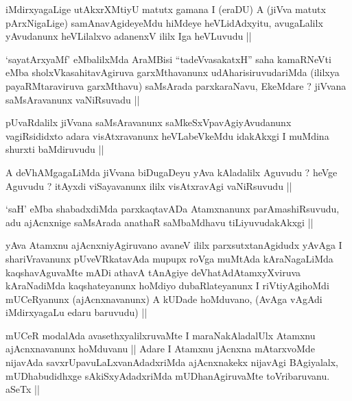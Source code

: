 \begin{artha}
iMdirxyagaLige utAkxrXMtiyU matutx gamana I (eraDU) A (jiVva matutx
pArxNigaLige) samAnavAgideyeMdu hiMdeye heVLidAdxyitu, avugaLalilx
yAvudanunx heVLilalxvo adanenxV ililx Iga heVLuvudu ||
\end{artha}


\begin{artha}
`sayatArxyaMf' eMbalilxMda AraMBisi ``tadeVvasakatxH'' saha kamaRNeVti
  eMba sholxVkasahitavAgiruva garxMthavanunx udAharisiruvudariMda
  (ililxya payaRMtaraviruva garxMthavu) saMsArada parxkaraNavu,
  EkeMdare ? jiVvana saMsAravanunx vaNiRsuvadu ||
\end{artha}


\begin{artha}
pUvaRdalilx jiVvana saMsAravanunx saMkeSxVpavAgiyAvudanunx
vagiRsididxto adara visAtxravanunx heVLabeVkeMdu idakAkxgi I muMdina
shurxti baMdiruvudu ||
\end{artha}

\begin{artha}
A deVhAMgagaLiMda jiVvana biDugaDeyu yAva kAladalilx Aguvudu ? heVge
Aguvudu ? itAyxdi viSayavanunx ililx visAtxravAgi vaNiRsuvudu ||
\end{artha}

\begin{artha}
`saH' eMba shabadxdiMda parxkaqtavADa Atamxnanunx parAmashiRsuvudu,
  adu ajAcnxnige saMsArada anathaR saMbaMdhavu tiLiyuvudakAkxgi ||
\end{artha}

\begin{artha}
yAva Atamxnu ajAcnxniyAgiruvano avaneV ililx parxsutxtanAgidudx yAvAga
I shariVravanunx pUveVRkatavAda mupupx roVga muMtAda kAraNagaLiMda
kaqshavAguvaMte mADi athavA tAnAgiye deVhatAdAtamxyXviruva kAraNadiMda
kaqshateyanunx hoMdiyo dubaRlateyanunx I riVtiyAgihoMdi mUCeRyanunx
(ajAcnxnavanunx) A kUDade hoMduvano,  (AvAga vAgAdi iMdirxyagaLu edaru
baruvudu) || 
\end{artha}

\begin{artha}
mUCeR modalAda avasethxyalilxruvaMte I maraNakAladalUlx Atamxnu
ajAcnxnavanunx hoMduvanu || Adare I Atamxnu jAcnxna mAtarxvoMde
nijavAda savxrUpavuLaLxvanAdadxriMda ajAcnxnakekx nijavAgi BAgiyalalx,
mUDhabudidhxge sAkiSxyAdadxriMda mUDhanAgiruvaMte toVribaruvanu. aSeTx ||
\end{artha}

